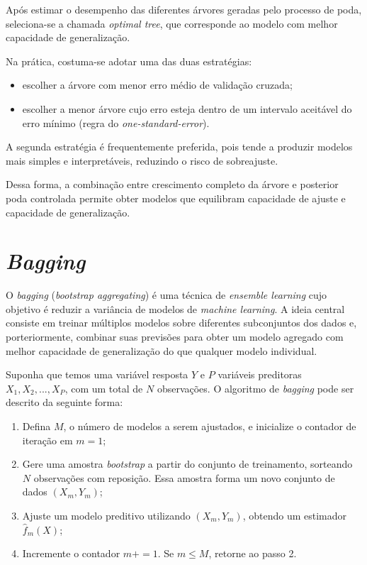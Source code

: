 \documentclass{article}
\begin{document}
Após estimar o desempenho das diferentes árvores geradas pelo processo de
poda, seleciona-se a chamada \textit{optimal tree}, que corresponde ao modelo 
com melhor capacidade de generalização.

Na prática, costuma-se adotar uma das duas estratégias:

\begin{itemize}
    \item escolher a árvore com menor erro médio de validação cruzada;
    \item escolher a menor árvore cujo erro esteja dentro de um intervalo
    aceitável do erro mínimo (regra do \textit{one-standard-error}).
\end{itemize}

A segunda estratégia é frequentemente preferida, pois tende a produzir
modelos mais simples e interpretáveis, reduzindo o risco de sobreajuste.

Dessa forma, a combinação entre crescimento completo da árvore e posterior
poda controlada permite obter modelos que equilibram capacidade de ajuste
e capacidade de generalização.

\section{\textit{Bagging}}

O \textit{bagging} (\textit{bootstrap aggregating}) é uma técnica de 
\textit{ensemble learning} cujo objetivo é reduzir a variância de modelos
de \textit{machine learning}. A ideia central consiste em treinar múltiplos
modelos sobre diferentes subconjuntos dos dados e, porteriormente, combinar
suas previsões para obter um modelo agregado com melhor capacidade de 
generalização do que qualquer modelo individual.

Suponha que temos uma variável resposta $Y$ e $P$ variáveis preditoras 
$X_1, X_2, ..., X_P$, com um total de $N$ observações. O algoritmo de 
\textit{bagging} pode ser descrito da seguinte forma:

\begin{enumerate}
    \item Defina $M$, o número de modelos a serem ajustados, e inicialize 
    o contador de iteração em $m = 1$;
    \item Gere uma amostra \textit{bootstrap} a partir do conjunto de
    treinamento, sorteando $N$ observações com reposição. Essa amostra
    forma um novo conjunto de dados $(X_m, Y_m)$;
    \item Ajuste um modelo preditivo utilizando $(X_m, Y_m)$, obtendo
    um estimador $\hat{f}_m(X)$;
    \item Incremente o contador $m += 1$. Se $m \leq M$,
    retorne ao passo 2.
\end{enumerate}
\end{document}

